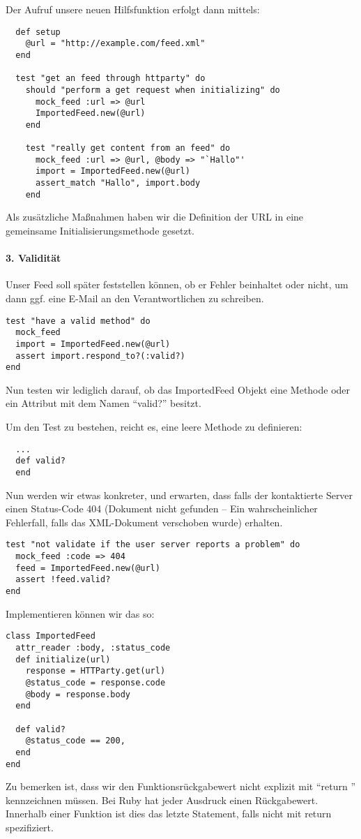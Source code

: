 Der Aufruf unsere neuen Hilfsfunktion erfolgt dann mittels:
\begin{lstlisting}
  def setup
    @url = "http://example.com/feed.xml"
  end

  test "get an feed through httparty" do
    should "perform a get request when initializing" do
      mock_feed :url => @url
      ImportedFeed.new(@url)
    end

    test "really get content from an feed" do
      mock_feed :url => @url, @body => "`Hallo"'
      import = ImportedFeed.new(@url)
      assert_match "Hallo", import.body
    end
\end{lstlisting}
Als zusätzliche Maßnahmen haben wir die Definition der URL in eine gemeinsame Initialisierungsmethode gesetzt. 


\paragraph{3. Validität} Unser Feed soll später feststellen können, ob er Fehler beinhaltet oder nicht, um dann ggf. eine E-Mail an den Verantwortlichen zu schreiben.

\begin{lstlisting}
test "have a valid method" do
  mock_feed
  import = ImportedFeed.new(@url)
  assert import.respond_to?(:valid?)
end 
\end{lstlisting}
Nun testen wir lediglich darauf, ob das ImportedFeed Objekt eine Methode oder ein Attribut mit dem Namen "`valid?"' besitzt.

Um den Test zu bestehen, reicht es, eine leere Methode zu definieren:
\begin{lstlisting}
  ...
  def valid?
  end
\end{lstlisting}
\tddgreen

Nun werden wir etwas konkreter, und erwarten, dass falls der kontaktierte Server einen Status-Code 404 (Dokument nicht gefunden -- Ein wahrscheinlicher Fehlerfall, falls das XML-Dokument verschoben wurde) erhalten.
\begin{lstlisting}
test "not validate if the user server reports a problem" do
  mock_feed :code => 404
  feed = ImportedFeed.new(@url)
  assert !feed.valid?
end
\end{lstlisting}
\tddred

Implementieren können wir das so:
\begin{lstlisting}
class ImportedFeed
  attr_reader :body, :status_code
  def initialize(url)
    response = HTTParty.get(url)
    @status_code = response.code
    @body = response.body
  end
  
  def valid?  
    @status_code == 200,
  end
end
\end{lstlisting}
\tddgreen
Zu bemerken ist, dass wir den Funktionsrückgabewert nicht explizit mit "`return "' kennzeichnen müssen. Bei Ruby hat jeder Ausdruck einen Rückgabewert. Innerhalb einer Funktion ist dies das letzte Statement, falls nicht mit return spezifiziert.

